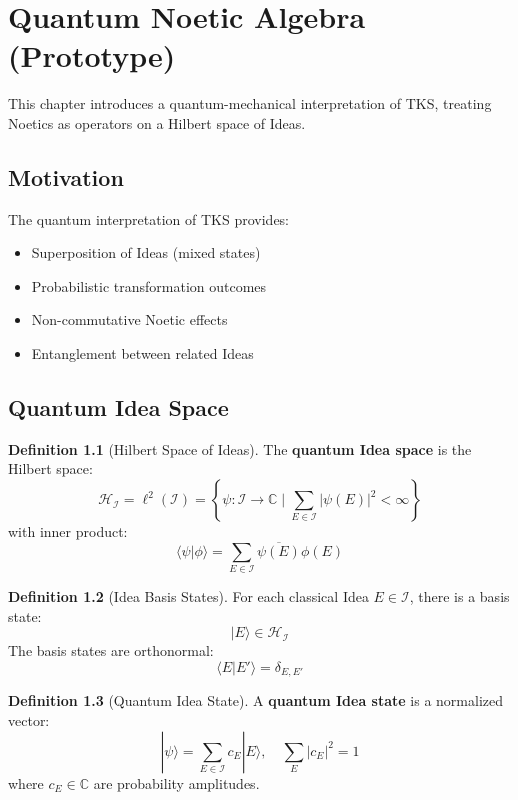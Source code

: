 \documentclass[11pt,twoside,openright]{book}
\theoremstyle{definition}
\newtheorem{definition}{Definition}[chapter]
\theoremstyle{plain}
\theoremstyle{remark}
\newcommand{\Ideas}{\mathcal{I}}
\newcommand{\Hspace}{\mathcal{H}}
\newcommand{\qket}[1]{|#1\rangle}
\newcommand{\qbraket}[2]{\langle#1|#2\rangle}
\newcommand{\vnew}{\textcolor{blue!70!black}{\textbf{[NEW v7.0]}}}
\begin{document}
\chapter{Quantum Noetic Algebra (Prototype)}
\label{ch:quantum}

\begin{tcolorbox}[colback=blue!5!white,colframe=blue!75!black,title=\vnew]
This chapter introduces a quantum-mechanical interpretation of TKS, treating Noetics as operators on a Hilbert space of Ideas.
\end{tcolorbox}

\section{Motivation}

The quantum interpretation of TKS provides:
\begin{itemize}
  \item Superposition of Ideas (mixed states)
  \item Probabilistic transformation outcomes
  \item Non-commutative Noetic effects
  \item Entanglement between related Ideas
\end{itemize}

\section{Quantum Idea Space}

\begin{definition}[Hilbert Space of Ideas]
\label{def:hilbert-ideas}
The \textbf{quantum Idea space} is the Hilbert space:
\[
\Hspace_\Ideas = \ell^2(\Ideas) = \left\{ \psi : \Ideas \to \mathbb{C} \mid \sum_{E \in \Ideas} |\psi(E)|^2 < \infty \right\}
\]
with inner product:
\[
\langle \psi | \phi \rangle = \sum_{E \in \Ideas} \overline{\psi(E)} \phi(E)
\]
\end{definition}

\begin{definition}[Idea Basis States]
\label{def:idea-basis}
For each classical Idea $E \in \Ideas$, there is a basis state:
\[
\qket{E} \in \Hspace_\Ideas
\]
The basis states are orthonormal:
\[
\qbraket{E}{E'} = \delta_{E,E'}
\]
\end{definition}

\begin{definition}[Quantum Idea State]
\label{def:quantum-state}
A \textbf{quantum Idea state} is a normalized vector:
\[
\qket{\psi} = \sum_{E \in \Ideas} c_E \qket{E}, \quad \sum_E |c_E|^2 = 1
\]
where $c_E \in \mathbb{C}$ are probability amplitudes.
\end{definition}
\end{document}
